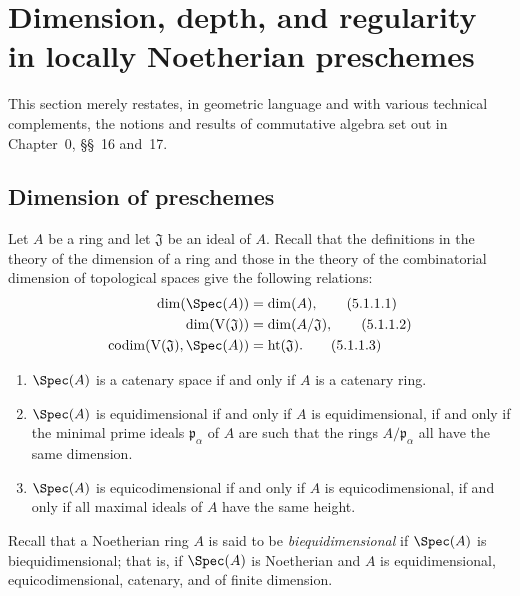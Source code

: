 \section{Dimension, depth, and regularity in locally Noetherian preschemes}
\label{section:IV.5}


This section merely restates, in geometric language and with various
technical complements, the notions and results of commutative algebra
set out in Chapter~0, \S\S~16 and~17.

\subsection{Dimension of preschemes}
\label{subsection:IV.5.1}

\begin{env}[5.1.1]
\label{IV.5.1.1}
Let $A$ be a ring and let $\mathfrak J$ be an ideal of $A$.
Recall  that the definitions in the theory of the
dimension of a ring  and those in the theory of the
combinatorial dimension of topological spaces  give
the following relations:
\begin{align}
\dim(\Spec(A))&=\dim(A),
\tag{5.1.1.1}\label{IV.5.1.1.1}\\
\dim(\mathrm V(\mathfrak J))&=\dim(A/\mathfrak J),
\tag{5.1.1.2}\label{IV.5.1.1.2}\\
\operatorname{codim}(\mathrm V(\mathfrak J),\Spec(A))
  &=\operatorname{ht}(\mathfrak J).
\tag{5.1.1.3}\label{IV.5.1.1.3}
\end{align}

\begin{enumerate}
\item[\rm(5.1.1.4)]
{}
$\Spec(A)$ is a catenary space if and only if $A$ is a catenary ring.
\item[\rm(5.1.1.5)]
{}
$\Spec(A)$ is equidimensional if and only if $A$ is equidimensional,
if and only if the minimal prime ideals $\mathfrak p_\alpha$ of $A$
are such that the rings $A/\mathfrak p_\alpha$ all have the same
dimension.
\item[\rm(5.1.1.6)]
{}
$\Spec(A)$ is equicodimensional if and only if $A$ is
equicodimensional, if and only if all maximal ideals of $A$ have the
same height.
\end{enumerate}

Recall that a Noetherian ring $A$ is said to be
\emph{biequidimensional} if $\Spec(A)$ is biequidimensional; that is,
if $\Spec(A)$ is Noetherian and $A$ is equidimensional,
equicodimensional, catenary, and of finite dimension.
\end{env}

